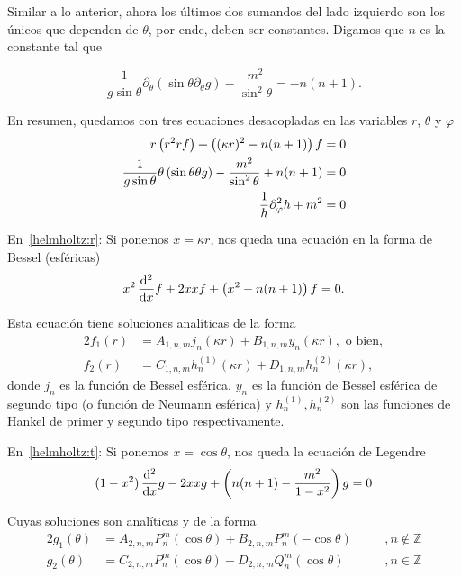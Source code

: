 \documentclass[11pt]{article}
\numberwithin{equation}{section}
\let\d\relax
\newcommand{\d}[1]{\,\frac{\mathrm{d}}{\mathrm{d}#1}}
\newcommand{\dd}[1]{\,\frac{\mathrm{d}^2}{\mathrm{d}#1}}
\begin{document}
Similar a lo anterior, ahora los últimos dos sumandos del lado izquierdo son los
únicos que dependen de \(\theta\), por ende, deben ser constantes. Digamos que
\(n\) es la constante tal que

\begin{displaymath}
	\frac{1}{g\sin\theta} \partial_{\theta} \left(\sin\theta \partial_{\theta} g\right)
	-
	\frac{m^2}{\sin^2\theta}
	=
	-n(n+1)
.\end{displaymath}

En resumen, quedamos con tres ecuaciones desacopladas en las variables \(r\),
\(\theta\) y \(\varphi\)
\begin{alignat}{3}
\label{helmholtz:r}
	\d{r} \left(r^2 \d{r} f\right)
	+
	\left((\kappa r)^2 - n (n+1)\right) f
	&= 0
	\\
\label{helmholtz:t}
	\frac{1}{g\sin\theta} \d{\theta} \left(\sin\theta \d{\theta} g\right)
	-
	\frac{m^2}{\sin^2\theta} + n(n+1)
	&= 0
	\\
\label{helmholtz:p}
	\frac{1}{h} \partial^2_{\varphi} h + m^2
	&= 0
\end{alignat}

En~\eqref{helmholtz:r}: Si ponemos \(x = \kappa r\), nos queda una ecuación en la
forma de Bessel (esféricas)
\begin{displaymath}
\label{eq:bessel:esfericas}
	x^2 \dd{x} f + 2x \d{x} f + \left(x^2 - n(n+1)\right) f = 0
.\end{displaymath}

Esta ecuación tiene soluciones analíticas de la forma
\begin{alignat}{2}
\label{f1}
	f_1(r) &= A_{1,n,m} j_n(\kappa r) + B_{1,n,m} y_n(\kappa r)
	, \text{ o bien},\\
\label{f2}
	f_2(r) &= C_{1,n,m} h_{n}^{(1)} (\kappa r) + D_{1,n,m} h^{(2)}_{n} (\kappa r),
\end{alignat}
donde \(j_n\) es la función de Bessel esférica, \(y_n\) es la función de Bessel
esférica de segundo tipo (o función de Neumann esférica) y \(h^{(1)}_n,
h^{(2)}_{n}\) son las funciones de Hankel de primer y segundo tipo
respectivamente.

En~\eqref{helmholtz:t}: Si ponemos \(x = \cos\theta\), nos queda la ecuación de
Legendre
\begin{displaymath}
\label{eq:legendre}
	(1-x^2) \dd{x} g - 2 x \d{x} g + \left(n(n+1) - \frac{m^2}{1-x^2}\right) g
	= 0
\end{displaymath}

Cuyas soluciones son analíticas y de la forma
\begin{alignat}{2}
\label{g1}
	g_1(\theta) &= A_{2,n,m} P^m_n(\cos\theta) + B_{2,n,m} P^m_n (-\cos\theta)
	\quad&&, n\not\in \mathbb{Z}\\
\label{g2}
	g_2(\theta) &= C_{2,n,m} P^m_n(\cos\theta) + D_{2,n,m} Q^m_n (\cos\theta)
	\quad&&, n\in \mathbb{Z}
\end{alignat}
\end{document}
